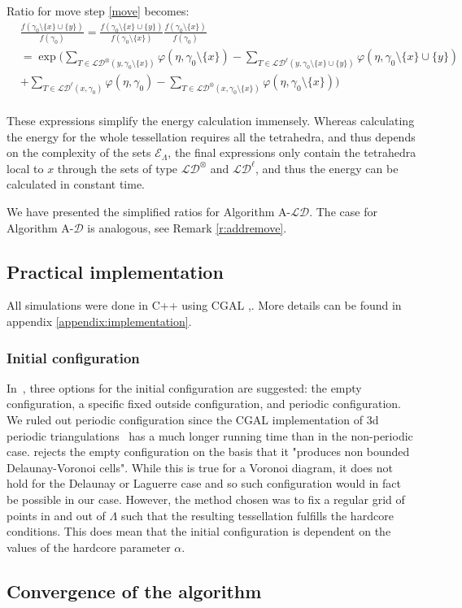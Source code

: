 Ratio for move step \ref{move} becomes:
\begin{align*}
& \frac{f(\gamma_0 \setminus\{x\} \cup\{y\})}{f(\gamma_0)}= 
\frac{f(\gamma_0 \setminus\{x\} \cup\{y\})}{f(\gamma_0 \setminus\{x\})} \frac{f(\gamma_0 \setminus\{x\})}{f(\gamma_0)} \\ 
&= \exp \Bigg(  \sum_{T \in \mathcal {LD}^\otimes (y,\gamma_0 \setminus\{x\})} \varphi(\eta,\gamma_0 \setminus\{x\})  - \sum_{T\in \mathcal {LD}^\ell (y,\gamma_0 \setminus\{x\} \cup\{y\})} \varphi(\eta,\gamma_0 \setminus\{x\} \cup\{y\})  \\
&+ \sum_{T\in \mathcal {LD}^\ell (x,\gamma_0)} \varphi(\eta,\gamma_0) - \sum_{T \in \mathcal {LD}^\otimes (x,\gamma_0 \setminus\{x\})} \varphi(\eta,\gamma_0 \setminus\{x\}) \Bigg) \\
\end{align*}


These expressions simplify the energy calculation immensely. Whereas calculating the energy for the whole tessellation requires all the tetrahedra, and thus depends on the complexity of the sets $\mathcal E_\Lambda$, the final expressions only contain the tetrahedra local to $x$ through the sets of type $\mathcal {LD}^\otimes$ and $\mathcal {LD}^\ell$, and thus the energy can be calculated in constant time.

We have presented the simplified ratios for Algorithm A-$\mathcal {LD}$. The case for Algorithm A-$\mathcal D$ is analogous, see Remark \ref{r:addremove}.

\subsection{Practical implementation}\label{sec:practical}
All simulations were done in C++ using CGAL \cite{cgal},\cite{cgal:3d-triang}. More details can be found in appendix \ref{appendix:implementation}.
\subsubsection{Initial configuration}
In~\cite{DereudreLavancier2010}, three options for the initial configuration are suggested: the empty configuration, a specific fixed outside configuration, and periodic configuration.
We ruled out periodic configuration since the CGAL implementation of 3d periodic triangulations~\cite{cgal:3d-period} has a much longer running time than in the non-periodic case. 
\cite{DereudreLavancier2010} rejects the empty configuration on the basis that it "produces non bounded Delaunay-Voronoi cells". While this is true for a Voronoi diagram, it does not hold for the Delaunay or Laguerre case and so such configuration would in fact be possible in our case.
However, the method chosen was to fix a regular grid of points in and out of $\Lambda$ such that the resulting tessellation fulfills the hardcore conditions. This does mean that the initial configuration is dependent on the values of the hardcore parameter $\alpha$. 



\subsection{Convergence of the algorithm}
\tbd
